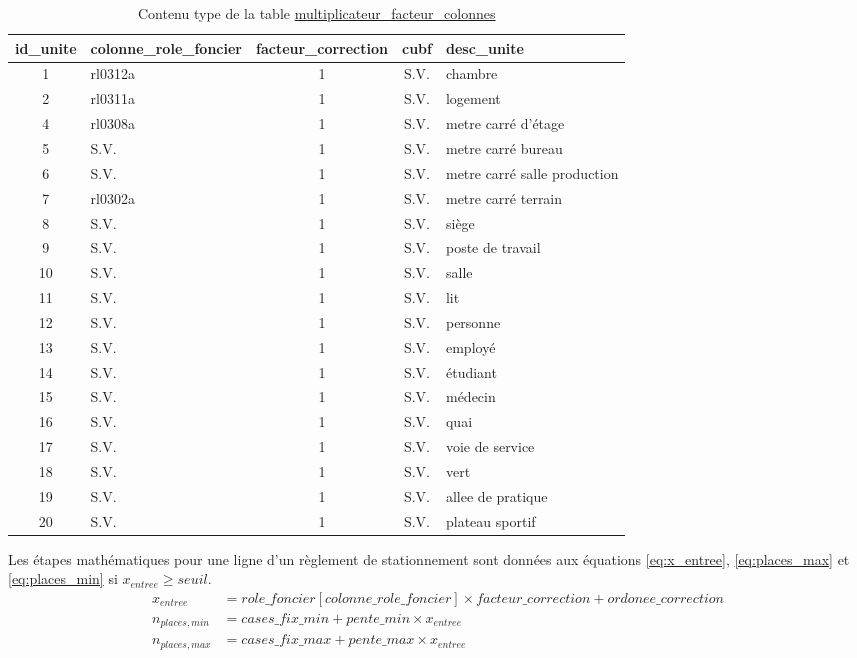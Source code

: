     \begin{table}[h]
    \centering
        \begin{tabular}{c l c c p{3cm}}
            \hline
            id\_unite & colonne\_role\_foncier & facteur\_correction & cubf & desc\_unite \\ \hline
            1 & rl0312a & 1 & S.V. & chambre\\
            2 & rl0311a & 1 & S.V. & logement \\
            4 & rl0308a & 1 & S.V. & metre carré d'étage\\
            5 & S.V. & 1 & S.V. & metre carré bureau\\
            \rowcolor{red}6 & S.V. & 1 & S.V. & metre carré salle production \\
            \rowcolor{red}7 & rl0302a & 1 & S.V. & metre carré terrain\\
            \rowcolor{red}8 & S.V. & 1 & S.V. & siège \\
            \rowcolor{red}9 & S.V. & 1 & S.V. & poste de travail \\
            \rowcolor{red}10 &S.V. & 1 & S.V. & salle \\
            \rowcolor{red}11 & S.V. & 1 & S.V. & lit \\
            \rowcolor{red}12 & S.V. & 1 & S.V. & personne \\
            \rowcolor{red}13 & S.V. & 1 & S.V. & employé \\
            \rowcolor{red}14 & S.V. & 1 & S.V. & étudiant \\
            \rowcolor{red}15 & S.V. & 1 & S.V. & médecin \\
            \rowcolor{red}16 & S.V. & 1 & S.V. & quai \\
            \rowcolor{red}17 & S.V. & 1 & S.V. & voie de service \\
            \rowcolor{red}18 & S.V. & 1 & S.V. & vert \\
            \rowcolor{red}19 & S.V. & 1 & S.V. & allee de pratique \\
            \rowcolor{red}20 & S.V. & 1 & S.V. & plateau sportif \\ \hline
        \end{tabular}
        \caption{Contenu type de la table \underline{multiplicateur\_facteur\_colonnes}}\label{tab:unite_pertinentes_minimum_stat}
    \end{table}
    \FloatBarrier
    Les étapes mathématiques pour une ligne d'un règlement de stationnement sont données aux équations \ref{eq:x_entree}, \ref{eq:places_max} et \ref{eq:places_min} si $x_{entree} \geq seuil $.
    \begin{align}
        x_{entree} &= role\_foncier[colonne\_role\_foncier] \times facteur\_correction \label{eq:x_entree}+ordonee\_correction\\
        n_{places,min} &= cases\_fix\_min + pente\_min \times x_{entree} \label{eq:places_min}\\
        n_{places,max} &= cases\_fix\_max + pente\_max \times x_{entree} \label{eq:places_max}
    \end{align}
    \clearpage
